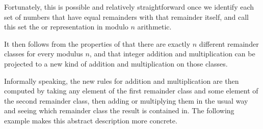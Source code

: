 Fortunately, this is possible and relatively straightforward once we identify each set of numbers that have equal remainders with that remainder itself, and call this set the  or  representation in modulo $n$ arithmetic.

It then follows from the properties of  that there are exactly $ n $ different remainder classes for every modulus $n$, and that integer addition and multiplication can be projected to a new kind of addition and multiplication on those classes.

Informally speaking, the new rules for addition and multiplication are then computed by taking any element of the first remainder class and some element of the second remainder class, then adding or multiplying them in the usual way and seeing which remainder class the result is contained in. The following example makes this abstract description more concrete.

